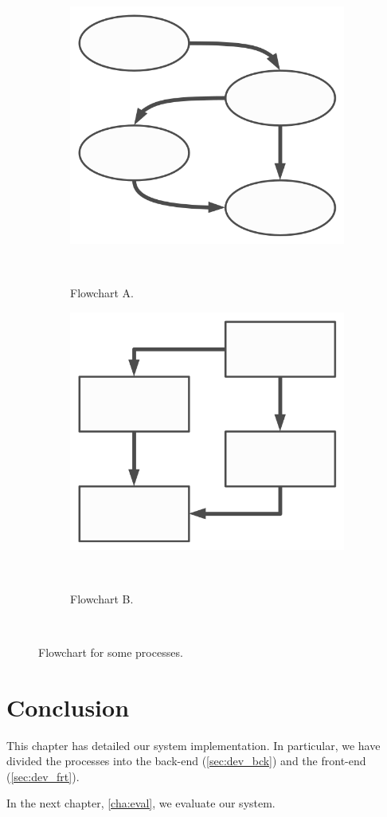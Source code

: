 \begin{figure}[ht]
    \centering
    \hspace{1cm}
    \begin{subfigure}{.35\textwidth}
        \centering
        \includegraphics[width=\columnwidth]{2_main_body/images/flowchartA.png}
        \caption{Flowchart A.}~\label{fig:flowchart_a}
    \end{subfigure}
    \hfill
    \begin{subfigure}{.35\textwidth}
      \centering
        \includegraphics[width=\columnwidth]{2_main_body/images/flowchartB.png}
        \caption{Flowchart B.}~\label{fig:flowchart_b}
    \end{subfigure}
    \hspace{1cm}
    \caption[Flowcharts]{Flowchart for some processes.}~\label{fig:flowcharts}
\end{figure}

\section{Conclusion}
\label{sec:dev_concl}

This chapter has detailed our system implementation. In particular, we have divided the processes into the back-end (\cref{sec:dev_bck}) and the front-end (\cref{sec:dev_frt}).

In the next chapter, \cref{cha:eval}, we evaluate our system.